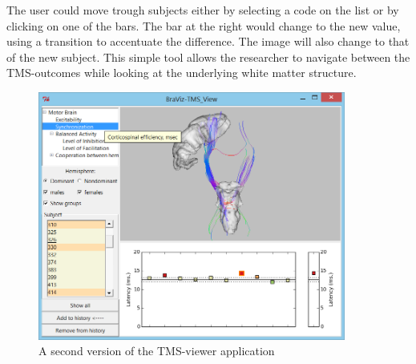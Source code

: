 The user could move trough subjects either by selecting a code on the list or by clicking on one of the bars. The bar at the right would change to the new value, using a transition to accentuate the difference. The image will also change to that of the new subject. This simple tool allows the researcher to navigate between the TMS-outcomes while looking at the underlying white matter structure. 

\begin{figure}
	\centering
		\includegraphics[width=0.90\textwidth]{figures/analysis/tms_view_motor}
	\caption{A second version of the TMS-viewer application}
	\label{fig_tms_view_second}
\end{figure}

